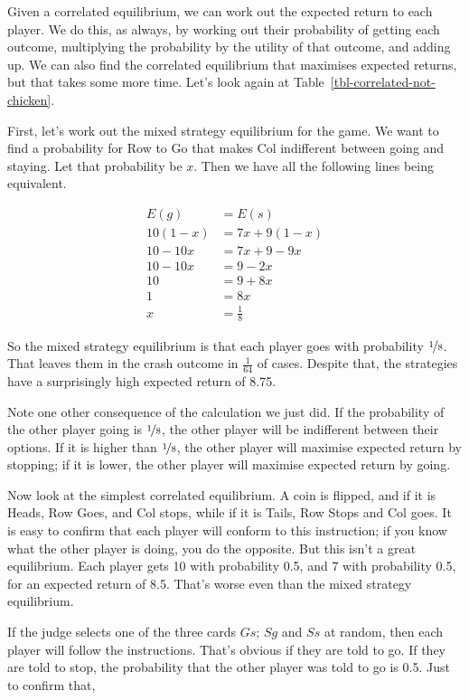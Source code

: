 \documentclass[
  11pt,
  letterpaper,
]{scrbook}
\begin{document}
Given a correlated equilibrium, we can work out the expected return to
each player. We do this, as always, by working out their probability of
getting each outcome, multiplying the probability by the utility of that
outcome, and adding up. We can also find the correlated equilibrium that
maximises expected returns, but that takes some more time. Let's look
again at Table~\ref{tbl-correlated-not-chicken}.

First, let's work out the mixed strategy equilibrium for the game. We
want to find a probability for Row to Go that makes Col indifferent
between going and staying. Let that probability be \(x\). Then we have
all the following lines being equivalent.

\begin{align*}
E(g) &= E(s) \\
10(1-x) &= 7x + 9(1-x) \\
10 - 10x &= 7x + 9 - 9x \\
10 - 10x &= 9 - 2x \\
10 &= 9 + 8x \\
1 &= 8x \\
x &= \frac{1}{8}
\end{align*}

So the mixed strategy equilibrium is that each player goes with
probability \(\nicefrac{1}{8}\). That leaves them in the crash outcome
in \(\frac{1}{64}\) of cases. Despite that, the strategies have a
surprisingly high expected return of 8.75.

Note one other consequence of the calculation we just did. If the
probability of the other player going is \(\nicefrac{1}{8}\), the other
player will be indifferent between their options. If it is higher than
\(\nicefrac{1}{8}\), the other player will maximise expected return by
stopping; if it is lower, the other player will maximise expected return
by going.

Now look at the simplest correlated equilibrium. A coin is flipped, and
if it is Heads, Row Goes, and Col stops, while if it is Tails, Row Stops
and Col goes. It is easy to confirm that each player will conform to
this instruction; if you know what the other player is doing, you do the
opposite. But this isn't a great equilibrium. Each player gets 10 with
probability 0.5, and 7 with probability 0.5, for an expected return of
8.5. That's worse even than the mixed strategy equilibrium.

If the judge selects one of the three cards \(Gs\); \(Sg\) and \(Ss\) at
random, then each player will follow the instructions. That's obvious if
they are told to go. If they are told to stop, the probability that the
other player was told to go is 0.5. Just to confirm that,
\end{document}
